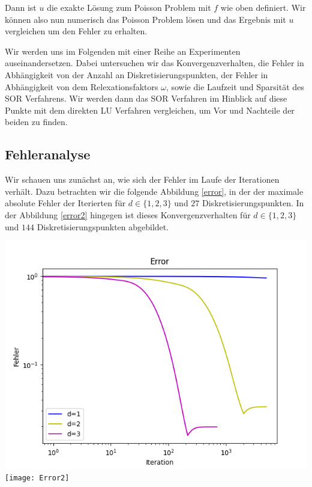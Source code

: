 \documentclass[smallheadings]{scrartcl}
\theoremstyle{definition}
\begin{document}
Dann ist $u$ die exakte Lösung zum Poisson Problem mit $f$ wie oben definiert. Wir können also nun numerisch das Poisson Problem lösen und das Ergebnis mit $u$ vergleichen um den Fehler zu erhalten. \cbend

Wir werden uns im Folgenden mit einer Reihe an Experimenten auseinandersetzen.  Dabei untersuchen wir das Konvergenzverhalten, die Fehler in Abhängigkeit von der Anzahl an Diskretisierungspunkten,  der Fehler in Abhängigkeit von dem Relexationsfaktors $\omega $, sowie die Laufzeit und Sparsität des SOR Verfahrens. Wir werden dann das SOR Verfahren im Hinblick auf diese Punkte mit dem direkten LU Verfahren vergleichen, um Vor und Nachteile der beiden zu finden.
\subsection{Fehleranalyse}
Wir schauen uns zunächst an, wie sich der Fehler im Laufe der Iterationen verhält. Dazu betrachten wir die folgende Abbildung \ref{error}, in der der maximale absolute Fehler der Iterierten für $d\in\{1,2,3\}$ und $27$ Diskretisierungspunkten.   In der Abbildung \ref{error2} hingegen ist dieses Konvergenzverhalten für $d\in\{1,2,3\}$ und $144$ Diskretisierungspunkten abgebildet.




\begin{minipage}{\textwidth}

 \centering
 \includegraphics[scale = 0.9]{Error1}
 	\label{error}
 	\texttt{[image: Error2]}
 	\label{error2}

 \end{minipage}
 
\end{document}
